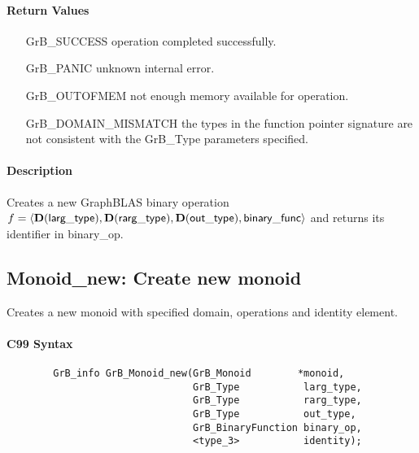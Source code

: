 \paragraph{Return Values}

\begin{itemize}[leftmargin=2.1in]
\item[{\sf GrB\_SUCCESS}]           operation completed successfully.
\item[{\sf GrB\_PANIC}]             unknown internal error.
\item[{\sf GrB\_OUTOFMEM}]          not enough memory available for operation.
\item[{\sf GrB\_DOMAIN\_MISMATCH}]  the types in the function pointer signature are not   
                                    consistent with the {\sf GrB\_Type} parameters specified.
\end{itemize}

\paragraph{Description}

Creates a new GraphBLAS binary operation $f = \langle \bold{D}({\sf larg\_type}), 
\bold{D}({\sf rarg\_type}), \bold{D}({\sf out\_type}), {\sf binary\_func} \rangle$ and returns its identifier in {\sf binary\_op}.




\subsection{{\sf Monoid\_new}: Create new monoid}

Creates a new monoid with specified domain, operations and identity element.

\paragraph{C99 Syntax}

\begin{verbatim}
        GrB_info GrB_Monoid_new(GrB_Monoid        *monoid,
                                GrB_Type           larg_type,
                                GrB_Type           rarg_type,
                                GrB_Type           out_type,
                                GrB_BinaryFunction binary_op,
                                <type_3>           identity);
\end{verbatim}

